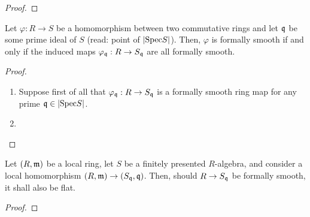             \begin{proposition}
                
            \end{proposition}
                \begin{proof}
                    
                \end{proof}
                
            \begin{proposition} \label{prop: formal_smoothness_is_local}
                Let $\varphi: R \to S$ be a homomorphism between two commutative rings and let $\mathfrak{q}$ be some prime ideal of $S$ (read: point of $|\mathrm{Spec} S|$). Then, $\varphi$ is formally smooth if and only if the induced maps $\varphi_{\mathfrak{q}}: R \to S_{\mathfrak{q}}$ are all formally smooth. 
            \end{proposition}
                \begin{proof}
                    \noindent
                    \begin{enumerate}
                        \item Suppose first of all that $\varphi_{\mathfrak{q}}: R \to S_{\mathfrak{q}}$ is a formally smooth ring map for any prime $\mathfrak{q} \in |\mathrm{Spec} S|$.  
                        \item 
                    \end{enumerate}
                \end{proof}
                
            \begin{proposition}[Formally smooth + finite type + local = flat] \label{prop: formally_smooth_finite_type_local_morphisms_are_flat}
                Let $(R, \mathfrak{m})$ be a local ring, let $S$ be a finitely presented $R$-algebra, and consider a local homomorphism $(R, \mathfrak{m}) \to (S_{\mathfrak{q}}, \mathfrak{q})$. Then, should $R \to S_{\mathfrak{q}}$ be formally smooth, it shall also be flat. 
            \end{proposition}
                \begin{proof}
                    
                \end{proof}
    
